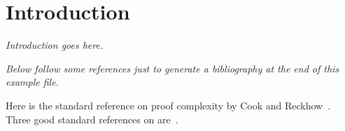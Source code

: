 \section{Introduction}
\label{sec:intro}

\emph{Introduction goes here.}

\emph{Below follow some references just to generate a bibliography at
  the end of this example file.}

Here is the standard reference on proof complexity by Cook and
Reckhow~\cite{CR79Relative}. 
%
Three good standard references on
are~\cite{BS97UsingCSP,MS99Grasp,MMZZM01Engineering}.
